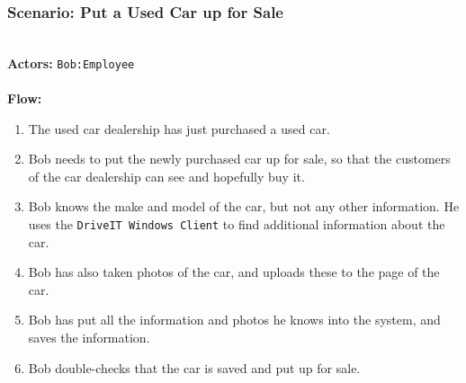 \subsubsection{Scenario: Put a Used Car up for Sale}
\label{sec:scenario-createcar}
\HRule \\[0.4cm]
\textbf{Actors:} \texttt{Bob:Employee}\\
\HRule \\[0.4cm]
\textbf{Flow:} \\
\begin{enumerate}
\item The used car dealership has just purchased a used car.
\item Bob needs to put the newly purchased car up for sale, so that the customers of the car dealership can see and hopefully buy it.
\item Bob knows the make and model of the car, but not any other information. He uses the \texttt{DriveIT Windows Client} to find additional information about the car. 
\item Bob has also taken photos of the car, and uploads these to the page of the car. 
\item Bob has put all the information and photos he knows into the system, and saves the information. 
\item Bob double-checks that the car is saved and put up for sale.
\end{enumerate}
\HRule \\[0.4cm]
